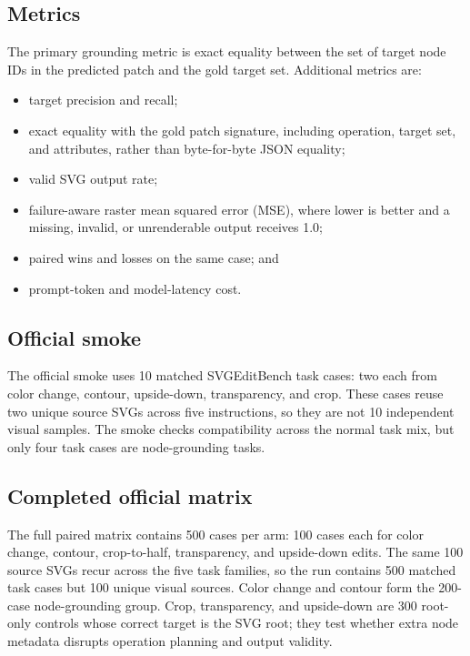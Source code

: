 \documentclass[10pt,a4paper]{article}
\begin{document}
\subsection{Metrics}

The primary grounding metric is exact equality between the set of target node
IDs in the predicted patch and the gold target set. Additional metrics are:

\begin{itemize}
  \item target precision and recall;
  \item exact equality with the gold patch signature, including operation,
  target set, and attributes, rather than byte-for-byte JSON equality;
  \item valid SVG output rate;
  \item failure-aware raster mean squared error (MSE), where lower is better
  and a missing, invalid, or unrenderable output receives 1.0;
  \item paired wins and losses on the same case; and
  \item prompt-token and model-latency cost.
\end{itemize}

\subsection{Official smoke}

The official smoke uses 10 matched SVGEditBench task cases: two each from color
change, contour, upside-down, transparency, and crop. These cases reuse two
unique source SVGs across five instructions, so they are not 10 independent
visual samples. The smoke checks compatibility across the normal task mix, but
only four task cases are node-grounding tasks.

\subsection{Completed official matrix}

The full paired matrix contains 500 cases per arm: 100 cases each for color
change, contour, crop-to-half, transparency, and upside-down edits. The same
100 source SVGs recur across the five task families, so the run contains 500
matched task cases but 100 unique visual sources. Color change and contour form
the 200-case node-grounding group. Crop, transparency, and upside-down are
300 root-only controls whose correct target is the SVG root; they test whether
extra node metadata disrupts operation planning and output validity.
\end{document}
